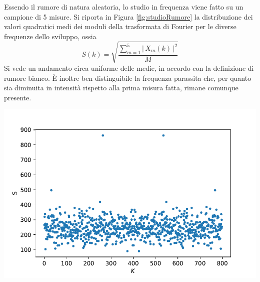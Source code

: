 \documentclass[10pt,oneside,a4paper]{article}
\newcommand{\abs}[1]{\left\lvert\,#1\,\right\rvert}
\newenvironment{Figure}
  {\par\medskip\noindent\minipage{\linewidth}}
  {\endminipage\par\medskip}
\begin{document}
\begin{multicols}{2}
Essendo il rumore di natura aleatoria, lo studio in frequenza viene fatto su un campione di 5 misure. Si riporta in Figura \ref{fig:studioRumore} la distribuzione dei valori quadratici medi dei moduli della trasformata di Fourier per le diverse frequenze dello sviluppo, ossia
\[
S(k) = \sqrt{\frac{\sum_{m=1}^5\abs{X_m(k)}^2}{M}} 
\]
Si vede un andamento circa uniforme delle medie, in accordo con la definizione di rumore bianco. È inoltre ben distinguibile la frequenza parassita che, per quanto sia diminuita in intensità rispetto alla prima misura fatta, rimane comunque presente.
\begin{Figure}
	\begin{center}
	\includegraphics[width=\linewidth]{studioRumore}
	\label{fig:studioRumore}
	\end{center}
\end{Figure}


\end{multicols}
\end{document}
